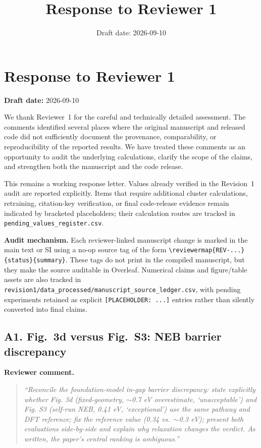 \documentclass[11pt,a4paper]{article}
\title{\textbf{Response to Reviewer 1}}
\author{}
\date{Draft date: 2026-09-10}
\begin{document}
\maketitle
\thispagestyle{fancy}

\section*{Response to Reviewer 1}

\noindent\textbf{Draft date:} 2026-09-10

\vspace{0.5em}

We thank Reviewer~1 for the careful and technically detailed assessment. The comments identified several places where the original manuscript and released code did not sufficiently document the provenance, comparability, or reproducibility of the reported results. We have treated these comments as an opportunity to audit the underlying calculations, clarify the scope of the claims, and strengthen both the manuscript and the code release.

This remains a working response letter. Values already verified in the Revision~1 audit are reported explicitly. Items that require additional cluster calculations, retraining, citation-key verification, or final code-release evidence remain indicated by bracketed placeholders; their calculation routes are tracked in \texttt{pending\_values\_register.csv}.

\noindent\textbf{Audit mechanism.}
Each reviewer-linked manuscript change is marked in the main text or SI using a no-op source tag of the form \texttt{\textbackslash reviewermap\{REV-...\}\{status\}\{summary\}}. These tags do not print in the compiled manuscript, but they make the source auditable in Overleaf. Numerical claims and figure/table assets are also tracked in \texttt{revision1/data\_processed/manuscript\_source\_ledger.csv}, with pending experiments retained as explicit \texttt{[PLACEHOLDER: ...]} entries rather than silently converted into final claims.

\subsection*{A1. Fig.~3d versus Fig.~S3: NEB barrier discrepancy}

\noindent\textbf{Reviewer comment.}
\begin{quote}
\itshape
``Reconcile the foundation-model in-gap barrier discrepancy: state explicitly whether Fig. 3d (fixed-geometry, $\sim$0.7 eV overestimate, `unacceptable') and Fig. S3 (self-run NEB, 0.41 eV, `exceptional') use the same pathway and DFT reference; fix the reference value (0.34 vs.\ $\sim$0.3 eV); present both evaluations side-by-side and explain why relaxation changes the verdict. As written, the paper's central ranking is ambiguous.''
\end{quote}
\end{document}
